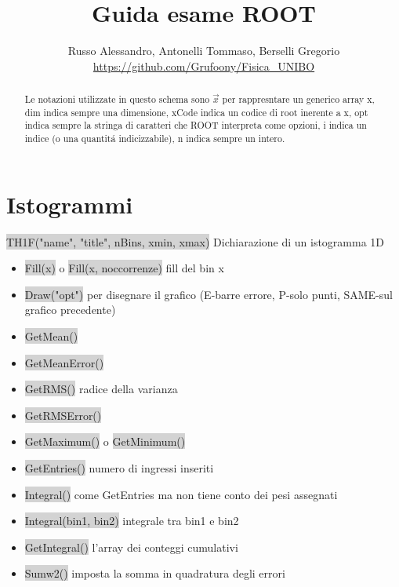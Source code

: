 \documentclass[a4paper]{article}
\begin{document}
	\title{Guida esame ROOT}
	\author{Russo Alessandro, Antonelli Tommaso, Berselli Gregorio\\\url{https://github.com/Grufoony/Fisica_UNIBO}}
    \maketitle
\begin{abstract}
    Le notazioni utilizzate in questo schema sono $\vec{x}$ per rappresntare un generico array x, dim indica sempre una dimensione, xCode indica un codice di root inerente a x, opt indica sempre la stringa di caratteri che ROOT interpreta come opzioni, i indica un indice (o una quantit\'a indicizzabile), n indica sempre un intero.
\end{abstract}
\section{Istogrammi}
    \colorbox{LightGray}{TH1F("name", "title", nBins, xmin, xmax)} Dichiarazione di un istogramma 1D
    \begin{itemize}
        \item \colorbox{LightGray}{Fill(x)} o \colorbox{LightGray}{Fill(x, noccorrenze)} fill del bin x 
        \item \colorbox{LightGray}{Draw("opt")} per disegnare il grafico (E-barre errore, P-solo punti, SAME-sul grafico precedente)
        \item \colorbox{LightGray}{GetMean()}
        \item \colorbox{LightGray}{GetMeanError()}
        \item \colorbox{LightGray}{GetRMS()} radice della varianza
        \item \colorbox{LightGray}{GetRMSError()}
        \item \colorbox{LightGray}{GetMaximum()} o \colorbox{LightGray}{GetMinimum()}
        \item \colorbox{LightGray}{GetEntries()} numero di ingressi inseriti
        \item \colorbox{LightGray}{Integral()} come GetEntries ma non tiene conto dei pesi assegnati
        \item \colorbox{LightGray}{Integral(bin1, bin2)} integrale tra bin1 e bin2
        \item \colorbox{LightGray}{GetIntegral()} l'array dei conteggi cumulativi
        \item \colorbox{LightGray}{Sumw2()} imposta la somma in quadratura degli errori
    \end{itemize}
\end{document}
